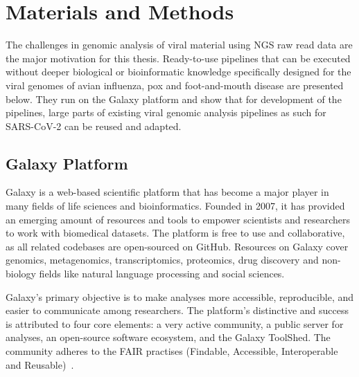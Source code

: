 \chapter{Materials and Methods}\label{chap:methods}
The challenges in genomic analysis of viral material using \ac{NGS} raw read data are the major motivation for this thesis. Ready-to-use pipelines that can be executed without deeper biological or bioinformatic knowledge specifically designed for the viral genomes of avian influenza, pox and foot-and-mouth disease are presented below. They run on the Galaxy platform and show that for development of the pipelines, large parts of existing viral genomic analysis pipelines as such for SARS-CoV-2 can be reused and adapted.

\section{Galaxy Platform}\label{sec:galaxy}
Galaxy is a web-based scientific platform that has become a major player in many fields of life sciences and bioinformatics. Founded in 2007, it has provided an emerging amount of resources and tools to empower scientists and researchers to work with biomedical datasets. The platform is free to use and collaborative, as all related codebases are open-sourced on GitHub. Resources on Galaxy cover genomics, metagenomics, transcriptomics, proteomics, drug discovery and non-biology fields like natural language processing and social sciences.

Galaxy's primary objective is to make analyses more accessible, reproducible, and easier to communicate among researchers. The platform's distinctive and success is attributed to four core elements: a very active community, a public server for analyses, an open-source software ecosystem, and the Galaxy ToolShed. The community adheres to the FAIR practises (Findable, Accessible, Interoperable and Reusable)~\cite{10.1093/nar/gkac247}.

